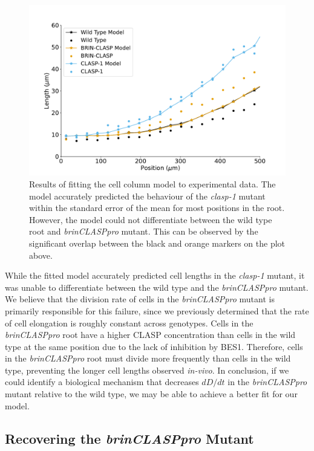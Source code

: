 \documentclass[referee,pdflatex,sn-mathphys-num]{sn-jnl}
\begin{document}
\begin{figure}
  \centering
  \includegraphics[width=\textwidth]{column-original-fit.pdf}
\caption{Results of fitting the cell column model to experimental data.
The model accurately predicted the behaviour of the \emph{clasp-1} mutant within the standard error of the mean for most positions in the root.
However, the model could not differentiate between the wild type root and \emph{brinCLASPpro} mutant.
This can be observed by the significant overlap between the black and orange markers on the plot above. }
\label{column-results}
\end{figure}

While the fitted model accurately predicted cell lengths in the \emph{clasp-1} mutant, it was unable to differentiate between the wild type and the \emph{brinCLASPpro} mutant.
We believe that the division rate of cells in the \emph{brinCLASPpro} mutant is primarily responsible for this failure, since we previously determined that the rate of cell elongation is roughly constant across genotypes.
Cells in the \emph{brinCLASPpro} root have a higher CLASP concentration than cells in the wild type at the same position due to the lack of inhibition by BES1.
Therefore, cells in the \emph{brinCLASPpro} root must divide more frequently than cells in the wild type, preventing the longer cell lengths observed \emph{in-vivo}.
In conclusion, if we could identify a biological mechanism that decreases $dD/dt$ in the \emph{brinCLASPpro} mutant relative to the wild type, we may be able to achieve a better fit for our model.

\subsection*{Recovering the \emph{brinCLASPpro} Mutant} 
\end{document}
